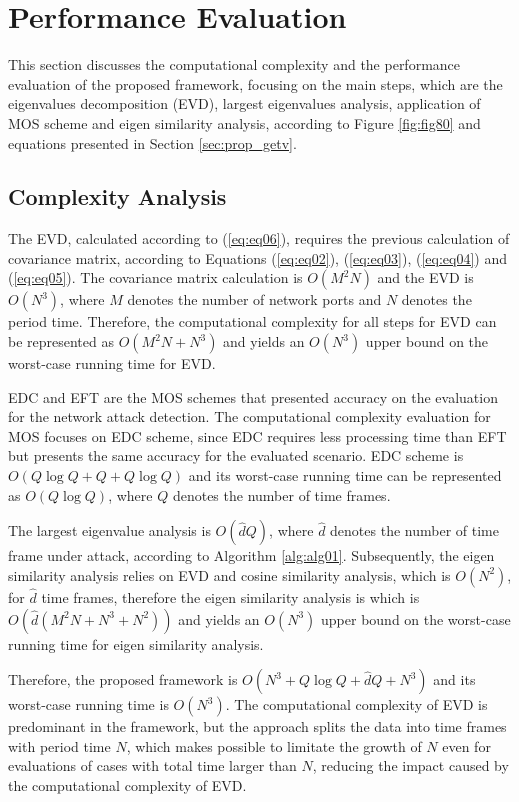 \documentclass[review]{elsarticle}
\begin{document}
\section{Performance Evaluation}
\label{sec:Complexity}

This section discusses the computational complexity and the performance evaluation of the proposed framework, focusing on the main steps, which are the eigenvalues decomposition (EVD), largest eigenvalues analysis, application of MOS scheme and eigen similarity analysis, according to Figure \ref{fig:fig80} and equations presented in Section \ref{sec:prop_getv}.

\subsection{Complexity Analysis}
\label{sec:ComplexityAnalysis}
The EVD, calculated according to (\ref{eq:eq06}), requires the previous calculation of covariance matrix, according to Equations (\ref{eq:eq02}), (\ref{eq:eq03}), (\ref{eq:eq04}) and (\ref{eq:eq05}). The covariance matrix calculation is $O(M^2N)$ and the EVD is $O(N^3)$, where $M$ denotes the number of network ports and $N$ denotes the period time. Therefore, the computational complexity for all steps for EVD can be represented as $O(M^2N + N^3)$ and yields an $O(N^3)$ upper bound on the worst-case running time for EVD.

EDC and EFT are the MOS schemes that presented accuracy on the evaluation for the network attack detection. The computational complexity evaluation for MOS focuses on EDC scheme, since EDC requires less processing time than EFT but presents the same accuracy for the evaluated scenario. EDC scheme is $O(Q \log Q + Q + Q \log Q)$ and its worst-case running time can be represented as $O(Q \log Q)$, where $Q$ denotes the number of time frames.

The largest eigenvalue analysis is $O(\hat{d}Q)$, where $\hat{d}$ denotes the number of time frame under attack, according to Algorithm \ref{alg:alg01}. Subsequently, the eigen similarity analysis relies on EVD and cosine similarity analysis, which is $O(N^2)$, for $\hat{d}$ time frames, therefore the eigen similarity analysis is which is $O(\hat{d}(M^2N + N^3 + N^2))$ and yields an $O(N^3)$ upper bound on the worst-case running time for eigen similarity analysis.

Therefore, the proposed framework is $O(N^3 + Q \log Q + \hat{d}Q + N^3)$ and its worst-case running time is $O(N^3)$. The computational complexity of EVD is predominant in the framework, but the approach splits the data into time frames with period time $N$, which makes possible to limitate the growth of $N$ even for evaluations of cases with total time larger than $N$, reducing the impact caused by the computational complexity of EVD. 
\end{document}
